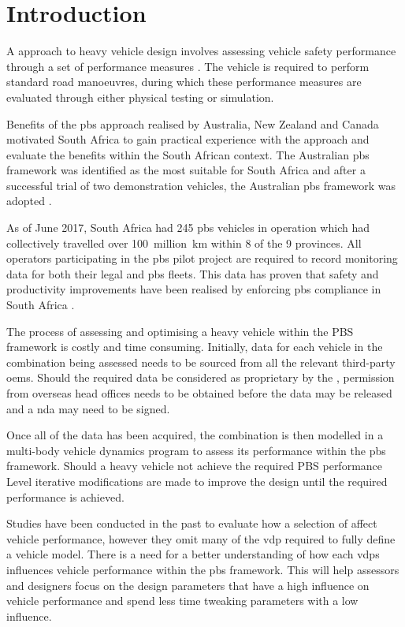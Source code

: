 \chapter{Introduction}\label{chapter:introduction}

A  approach to heavy vehicle design involves assessing vehicle safety performance through a set of performance measures \cite{Arredondo2012}. The vehicle is required to perform standard road manoeuvres, during which these performance measures are evaluated through either physical testing or simulation.

Benefits of the \gls{pbs} approach realised by Australia, New Zealand and Canada motivated South Africa to gain practical experience with the approach and evaluate the benefits within the South African context. The Australian \gls{pbs} framework was identified as the most suitable for South Africa and after a successful trial of two demonstration vehicles, the Australian \gls{pbs} framework was adopted \cite{Nordengen2014}. 

As of June 2017, South Africa had 245 \gls{pbs} vehicles in operation which had collectively travelled over 100~million~km within 8 of the 9 provinces. All operators participating in the \gls{pbs} pilot project are required to record monitoring data for both their legal and \gls{pbs} fleets. This data has proven that safety and productivity improvements have been realised by enforcing \gls{pbs} compliance in South Africa \cite{Nordengen2018}.

The process of assessing and optimising a heavy vehicle within the PBS framework is costly and time consuming. Initially, data for each vehicle in the combination being assessed needs to be sourced from all the relevant third-party \glspl{oem}. Should the required data be considered as proprietary by the , permission from overseas head offices needs to be obtained before the data may be released and a \gls{nda} may need to be signed. 

Once all of the data has been acquired, the combination is then modelled in a multi-body vehicle dynamics program to assess its performance within the \gls{pbs} framework. Should a heavy vehicle not achieve the required PBS performance Level iterative modifications are made to improve the design until the required performance is achieved. 

Studies have been conducted in the past to evaluate how a selection of  affect vehicle performance, however they omit many of the \gls{vdp} required to fully define a vehicle model. There is a need for a better understanding of how each \glspl{vdp} influences vehicle performance within the \gls{pbs} framework. This will help assessors and designers focus on the design parameters that have a high influence on vehicle performance and spend less time tweaking parameters with a low influence.

